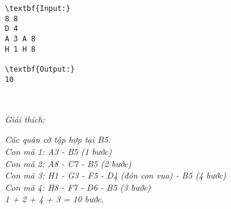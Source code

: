 \begin{verbatim}
\textbf{Input:}
8 8
D 4
A 3 A 8
H 1 H 8

\textbf{Output:}
10\end{verbatim}

 

\emph{Giải thích: }

\emph{Các quân cờ tập hợp tại B5.
\\Con mã 1: A3 - B5 (1 bước)
\\Con mã 2: A8 - C7 - B5 (2 bước)
\\Con mã 3: H1 - G3 - F5 - D4 (đón con vua) - B5 (4 bước)
\\Con mã 4: H8 - F7 - D6 - B5 (3 bước)
\\1 + 2 + 4 + 3 = 10 bước. }